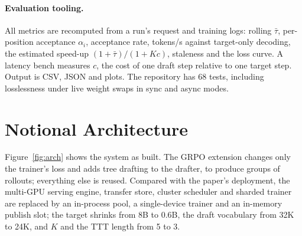 \documentclass[11pt]{article}
\newcommand{\taubar}{\bar{\tau}}
\begin{document}
\paragraph{Evaluation tooling.} All metrics are recomputed from a run's request and training logs: rolling
$\taubar$, per-position acceptance $\alpha_i$, acceptance rate, tokens/s against target-only decoding, the
estimated speed-up $(1+\taubar)/(1+Kc)$, staleness and the loss curve. A latency bench measures $c$, the cost of
one draft step relative to one target step. Output is CSV, JSON and plots. The repository has 68 tests,
including losslessness under live weight swaps in sync and async modes.

\section{Notional Architecture}

Figure~\ref{fig:arch} shows the system as built. The GRPO extension changes only the trainer's loss and adds tree
drafting to the drafter, to produce groups of rollouts; everything else is reused. Compared with the paper's
deployment, the multi-GPU serving engine, transfer store, cluster scheduler and sharded trainer are replaced by
an in-process pool, a single-device trainer and an in-memory publish slot; the target shrinks from 8B to 0.6B,
the draft vocabulary from 32K to 24K, and $K$ and the TTT length from 5 to 3.
\end{document}
